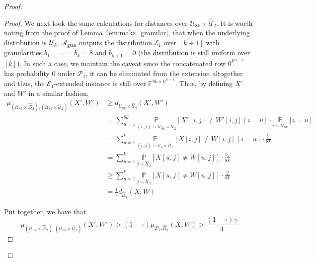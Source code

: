 \documentclass[11pt]{article}
\newcommand{\gran}{\mathsf{gran}}
\newcommand{\F}{\mathbb{F}}
\newcommand{\sU}{\mathcal{U}}
\newcommand{\sD}{\mathcal{D}}
\newcommand{\sA}{\mathcal{A}}
\newcommand{\sP}{\mathcal{P}}
\begin{document}
\begin{proof}
\begin{proof}
    We next look the same calculations for distances over $\sU_{8k} \times \widehat{\sU}_{2}$. It is worth noting from the proof of Lemma \ref{lem:make_granular}, that when the underlying distribution is $\sU_k$, $\sA_\gran$ outputs the distribution $\mathcal{E}_{1}$ over $[k+1]$ with granularities $b_1 = \dots = b_k = 8$ and $b_{k+1} = 0$ (the distribution is still uniform over $[k]$). In such a case, we maintain the caveat since the concatenated row $0^{k^{m-1}}$ has probability $0$ under $\sP_1$, it can be eliminated from the extension altogether and thus, the $\mathcal{E}_1$-extended instance is still over $\F^{8k \times k^{m-1}}$. Thus, by defining $X'$ and $W'$ in a similar fashion, 
    \begin{equation*}
        \begin{split}
            \mu_{(\sU_{8k} \times \widehat{\sD}_{2}), (\sU_{8k} \times \widehat{\sU}_{2})} (X', W') &\geq d_{\sU_{8k} \times \widehat{\sU}_{2}} (X', W') \\
             &= \sum_{u=1}^{8k} \underset{(i,j) \sim \sU_{8k} \times \widehat{\sU}_{2}}{\mathbb{P}} \left[ X'[i,j] \neq W'[i,j] \mid i = u \right] \cdot \underset{i \sim \sU_{8k}}{\mathbb{P}} [i=u]\\
            &= \sum_{u=1}^{k} \underset{(i,j) \sim \mathcal{E}_{1} \times \widehat{\sU}_{2}}{\mathbb{P}} \left[ X[i,j] \neq W[i,j] \mid i = u \right] \cdot \frac{b_{u}}{8k}\\
            &= \sum_{u=1}^{k} \underset{j \sim \widehat{\sU}_{2}}{\mathbb{P}} \left[ X[u,j] \neq W[u,j] \right] \cdot \frac{b_{u}}{8k}\\
            &\geq \sum_{u=1}^{k} \underset{j \sim \widehat{\sU}_{2}}{\mathbb{P}} \left[ X[u,j] \neq W[u,j] \right] \cdot \frac{2}{8k}\\
            &= \frac{1}{4}d_{\widehat{\sU}_{1}}(X, W)
        \end{split}
    \end{equation*}

    Put together, we have that 
    \begin{equation}
    \label{eq:gran_lb}
        \mu_{(\sU_{8k} \times \widehat{\sD}_{2}), (\sU_{8k} \times \widehat{\sU}_{2})} (X', W') > (1-\tau)\mu_{\widehat{\sD}_{1},\widehat{\sU}_{1}} (X, W)> \frac{(1-\tau)\gamma}{4}
    \end{equation}


\end{proof}
\end{proof}
\end{document}

